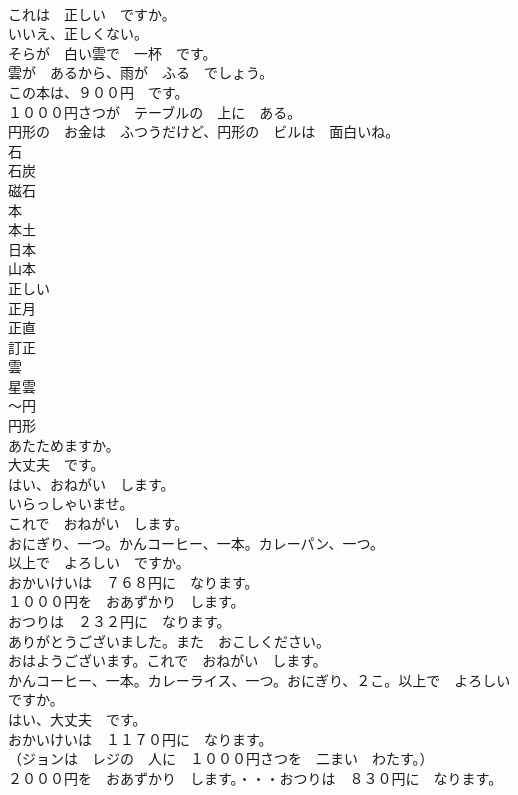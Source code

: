 \documentclass[8pt]{extreport}
\begin{document}
\begin{CJK}{UTF8}{min}
\\	これは　正しい　ですか。	
\\	いいえ、正しくない。	
\\	そらが　白い雲で　一杯　です。	
\\	雲が　あるから、雨が　ふる　でしょう。	
\\	この本は、９００円　です。	
\\	１０００円さつが　テーブルの　上に　ある。	
\\	円形の　お金は　ふつうだけど、円形の　ビルは　面白いね。	
\\	石	
\\	石炭	
\\	磁石	
\\	本	
\\	本土	
\\	日本	
\\	山本	
\\	正しい	
\\	正月	
\\	正直	
\\	訂正	
\\	雲	
\\	星雲	
\\	～円	
\\	円形	
\\	あたためますか。	
\\	大丈夫　です。	
\\	はい、おねがい　します。	
\\	いらっしゃいませ。	
\\	これで　おねがい　します。	
\\	おにぎり、一つ。かんコーヒー、一本。カレーパン、一つ。	
\\	以上で　よろしい　ですか。	
\\	おかいけいは　７６８円に　なります。	
\\	１０００円を　おあずかり　します。	
\\	おつりは　２３２円に　なります。	
\\	ありがとうございました。また　おこしください。	
\\	おはようございます。これで　おねがい　します。	
\\	かんコーヒー、一本。カレーライス、一つ。おにぎり、２こ。以上で　よろしい　ですか。	
\\	はい、大丈夫　です。	
\\	おかいけいは　１１７０円に　なります。	
\\	（ジョンは　レジの　人に　１０００円さつを　二まい　わたす。）	
\\	２０００円を　おあずかり　します。・・・おつりは　８３０円に　なります。	

\end{CJK}
\end{document}
